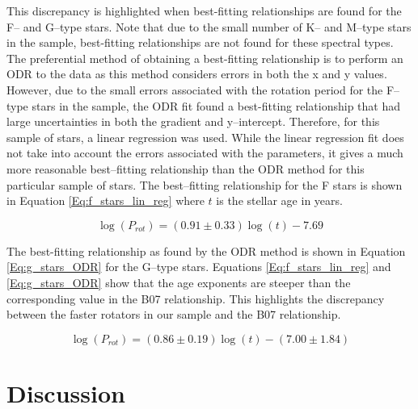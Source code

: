 This discrepancy is highlighted when best-fitting relationships are found for the F-- and G--type stars. Note that due to the small number of K-- and M--type stars in the sample, best-fitting relationships are not found for these spectral types. The preferential method of obtaining a best-fitting relationship is to perform an ODR to the data as this method considers errors in both the x and y values. However, due to the small errors associated with the rotation period for the F--type stars in the sample, the ODR fit found a best-fitting relationship that had large uncertainties in both the gradient and y--intercept. Therefore, for this sample of stars, a linear regression was used. While the linear regression fit does not take into account the errors associated with the parameters, it gives a much more reasonable best--fitting relationship than the ODR method for this particular sample of stars. The best--fitting relationship for the F stars is shown in Equation \ref{Eq:f_stars_lin_reg} where $t$ is the stellar age in years.

\begin{equation}
    \log(P_{rot}) = (0.91 \pm 0.33)\log(t) -7.69
    \label{Eq:f_stars_lin_reg}
\end{equation}

The best-fitting relationship as found by the ODR method is shown in Equation \ref{Eq:g_stars_ODR} for the G--type stars. Equations \ref{Eq:f_stars_lin_reg} and \ref{Eq:g_stars_ODR} show that the age exponents are steeper than the corresponding value in the B07 relationship. This highlights the discrepancy between the faster rotators in our sample and the B07 relationship.

\begin{equation}
    \log(P_{rot}) = (0.86 \pm 0.19)\log(t) - (7.00 \pm 1.84)
    \label{Eq:g_stars_ODR}
\end{equation}

\section{Discussion}

